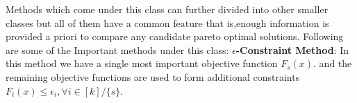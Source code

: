 Methods which come under this class can further divided into other smaller classes but all of them have a common feature that is,enough information is provided a priori to compare any candidate pareto optimal solutions.
\newline Following are some of the Important methods under this class:
\newline \newline \textbf{$\epsilon$-Constraint Method}:
In this method\cite{haimes1971bicriterion} we have a single most important objective function $F_s(x)$. and the remaining objective functions are used to form additional constraints $F_i(x) \le \epsilon_i,\forall i \in [k]/\{s\}$.

